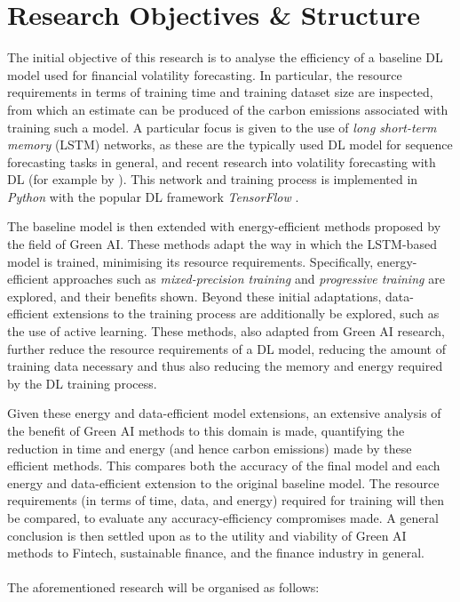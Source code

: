 \documentclass[a4paper, 11pt]{report}
\begin{document}
    \section{Research Objectives \& Structure}
    \label{section: structure}

    The initial objective of this research is to analyse the efficiency of a baseline DL model used for financial volatility forecasting. In particular, the resource requirements in terms of training time and training dataset size are inspected, from which an estimate can be produced of the carbon emissions associated with training such a model. A particular focus is given to the use of \emph{long short-term memory} (LSTM) networks, as these are the typically used DL model for sequence forecasting tasks in general, and recent research into volatility forecasting with DL (for example by \citet{xiong-2015}). This network and training process is implemented in \emph{Python} with the popular DL framework \emph{TensorFlow} \citep{abadi-2016}.

    The baseline model is then extended with energy-efficient methods proposed by the field of Green AI. These methods adapt the way in which the LSTM-based model is trained, minimising its resource requirements. Specifically, energy-efficient approaches such as \emph{mixed-precision training} and \emph{progressive training} are explored, and their benefits shown. Beyond these initial adaptations, data-efficient extensions to the training process are additionally be explored, such as the use of active learning. These methods, also adapted from Green AI research, further reduce the resource requirements of a DL model, reducing the amount of training data necessary and thus also reducing the memory and energy required by the DL training process.

    Given these energy and data-efficient model extensions, an extensive analysis of the benefit of Green AI methods to this domain is made, quantifying the reduction in time and energy (and hence carbon emissions) made by these efficient methods. This compares both the accuracy of the final model and each energy and data-efficient extension to the original baseline model. The resource requirements (in terms of time, data, and energy) required for training will then be compared, to evaluate any accuracy-efficiency compromises made. A general conclusion is then settled upon as to the utility and viability of Green AI methods to Fintech, sustainable finance, and the finance industry in general.
    \\ \\
    The aforementioned research will be organised as follows: 
\end{document}
